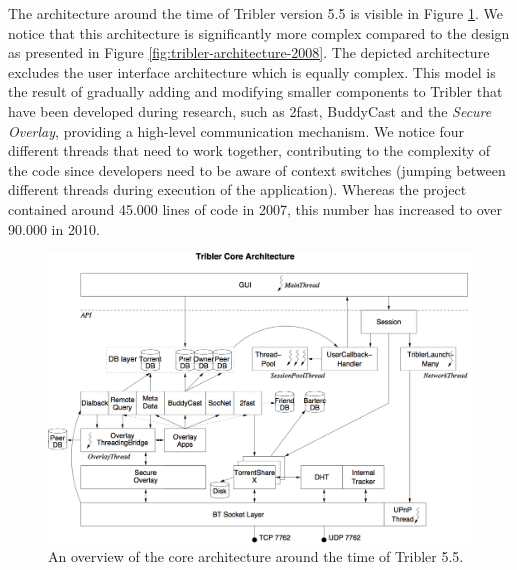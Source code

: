 The architecture around the time of Tribler version 5.5 is visible in Figure \ref{fig:tribler-core-architecture-55}. We notice that this architecture is significantly more complex compared to the design as presented in Figure \ref{fig:tribler-architecture-2008}. The depicted architecture excludes the user interface architecture which is equally complex. This model is the result of gradually adding and modifying smaller components to Tribler that have been developed during research, such as 2fast, BuddyCast and the \emph{Secure Overlay}, providing a high-level communication mechanism. We notice four different threads that need to work together, contributing to the complexity of the code since developers need to be aware of context switches (jumping between different threads during execution of the application). Whereas the project contained around 45.000 lines of code in 2007, this number has increased to over 90.000 in 2010.

\begin{figure}[h!]
	\centering
	\includegraphics[width=1.0\columnwidth]{images/architecture/core_architecture_55}
	\caption{An overview of the core architecture around the time of Tribler 5.5.}
	\label{fig:tribler-core-architecture-55}
\end{figure}

